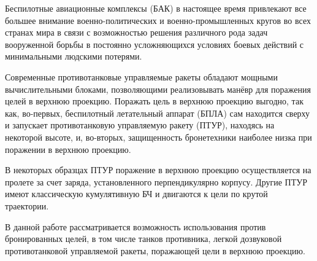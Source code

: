 \Introduction

Беспилотные авиационные комплексы (БАК) в настоящее время привлекают все большее внимание военно-политических и военно-промышленных кругов во всех странах мира в связи с возможностью решения различного рода задач вооруженной борьбы в постоянно усложняющихся условиях боевых действий с минимальными людскими потерями.


Современные противотанковые управляемые ракеты обладают мощными вычислительными блоками, позволяющими реализовывать манёвр для поражения целей в верхнюю проекцию. Поражать цель в верхнюю проекцию выгодно, так как, во-первых, беспилотный летательный аппарат (БПЛА) сам находится сверху и запускает противотанковую управляемую ракету (ПТУР), находясь на некоторой высоте, и, во-вторых, защищенность бронетехники наиболее низка при поражении в верхнюю проекцию.


В некоторых образцах ПТУР поражение в верхнюю проекцию осуществляется на пролете за счет заряда, установленного перпендикулярно корпусу. Другие ПТУР имеют классическую кумулятивную БЧ и двигаются к цели по крутой траектории.


В данной работе рассматривается возможность использования против бронированных целей, в том числе танков противника, легкой дозвуковой противотанковой управляемой ракеты, поражающей цели в верхнюю проекцию.


